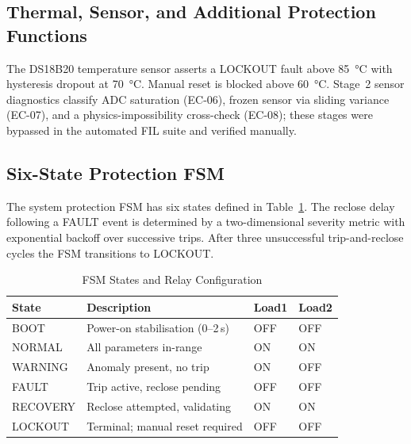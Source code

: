 \documentclass[conference]{IEEEtran}
\begin{document}
\subsection{Thermal, Sensor, and Additional Protection Functions}

The DS18B20 temperature sensor asserts a LOCKOUT fault above
\SI{85}{\degreeCelsius} with hysteresis dropout at
\SI{70}{\degreeCelsius}.  Manual reset is blocked above
\SI{60}{\degreeCelsius}.  Stage~2 sensor diagnostics classify ADC
saturation (EC-06), frozen sensor via sliding variance (EC-07), and a
physics-impossibility cross-check (EC-08); these stages were bypassed
in the automated FIL suite and verified manually.

\subsection{Six-State Protection FSM}
\label{subsec:fsm}

The system protection FSM has six states defined in
Table~\ref{tab:fsmstates}.  The reclose delay following a FAULT event
is determined by a two-dimensional severity metric with exponential
backoff over successive trips.  After three unsuccessful
trip-and-reclose cycles the FSM transitions to LOCKOUT.

\begin{table}[t]
  \caption{FSM States and Relay Configuration}
  \label{tab:fsmstates}
  \centering
  \renewcommand{\arraystretch}{1.15}
  \begin{tabular}{llll}
    \toprule
    \textbf{State} & \textbf{Description} & \textbf{Load1} & \textbf{Load2} \\
    \midrule
    BOOT     & Power-on stabilisation (0--2\,s) & OFF & OFF \\
    NORMAL   & All parameters in-range          & ON  & ON  \\
    WARNING  & Anomaly present, no trip         & ON  & OFF \\
    FAULT    & Trip active, reclose pending     & OFF & OFF \\
    RECOVERY & Reclose attempted, validating    & ON  & ON  \\
    LOCKOUT  & Terminal; manual reset required  & OFF & OFF \\
    \bottomrule
  \end{tabular}
\end{table}
\end{document}
